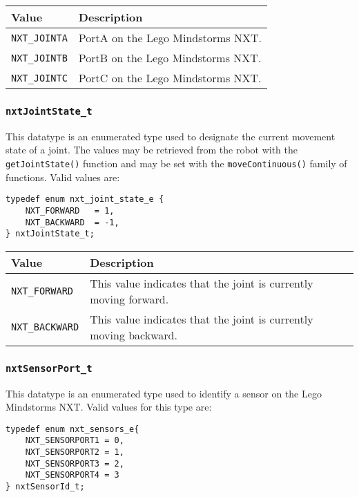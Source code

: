 \noindent
\begin{longtable}{p{3.5cm}p{12cm}} 
    \hline 
    Value & Description \\
    \hline 
    {\tt NXT\_JOINTA} & PortA on the Lego Mindstorms NXT. \\
    {\tt NXT\_JOINTB} & PortB on the Lego Mindstorms NXT. \\
    {\tt NXT\_JOINTC} & PortC on the Lego Mindstorms NXT. \\
    \hline
\end{longtable}

\subsubsection{\label{sec:nxtJointState_t}{\tt nxtJointState\_t}}
This datatype is an enumerated type used to designate the current 
movement state of a joint. The values may be retrieved from the 
robot with the {\tt getJointState()} function and may be set 
with the {\tt moveContinuous()} family of functions. Valid values are:
\begin{lstlisting}
typedef enum nxt_joint_state_e {
    NXT_FORWARD   = 1,
    NXT_BACKWARD  = -1,
} nxtJointState_t;
\end{lstlisting}

\noindent
\begin{longtable}{p{3.5cm}p{12cm}}
    \hline
    Value & Description \\
    \hline
    {\tt NXT\_FORWARD} & This value indicates that the joint is currently moving forward.  \\
{\tt NXT\_BACKWARD}& This value indicates that the joint is currently moving backward. \\
    \hline
\end{longtable}

\subsubsection{\label{sec:nxtSensorPort_t}{\tt nxtSensorPort\_t}}
This datatype is an enumerated type used to identify a sensor on 
the Lego Mindstorms NXT. Valid values for this type are:
\begin{lstlisting}
typedef enum nxt_sensors_e{
    NXT_SENSORPORT1 = 0,
    NXT_SENSORPORT2 = 1,
    NXT_SENSORPORT3 = 2,
    NXT_SENSORPORT4 = 3
} nxtSensorId_t;
\end{lstlisting}

